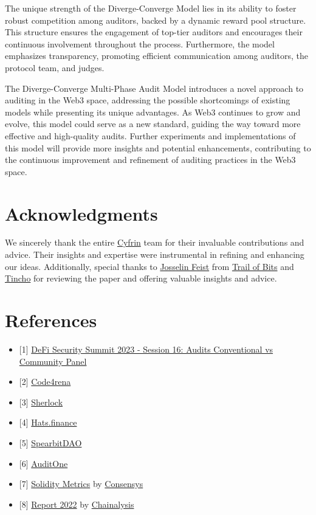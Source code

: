 \documentclass[10pt]{extarticle}
\def\tightlist{}
\begin{document}
The unique strength of the Diverge-Converge Model lies in its ability to
foster robust competition among auditors, backed by a dynamic reward
pool structure. This structure ensures the engagement of top-tier
auditors and encourages their continuous involvement throughout the
process. Furthermore, the model emphasizes transparency, promoting
efficient communication among auditors, the protocol team, and judges.

The Diverge-Converge Multi-Phase Audit Model introduces a novel approach
to auditing in the Web3 space, addressing the possible shortcomings of
existing models while presenting its unique advantages. As Web3
continues to grow and evolve, this model could serve as a new standard,
guiding the way toward more effective and high-quality audits. Further
experiments and implementations of this model will provide more insights
and potential enhancements, contributing to the continuous improvement
and refinement of auditing practices in the Web3 space.

\section{ Acknowledgments}\label{6-acknowledgments}

We sincerely thank the entire \href{https://www.cyfrin.io/}{Cyfrin} team
for their invaluable contributions and advice. Their insights and
expertise were instrumental in refining and enhancing our ideas.
Additionally, special thanks to
\href{https://twitter.com/Montyly}{Josselin Feist} from
\href{https://www.trailofbits.com/}{Trail of Bits} and
\href{https://twitter.com/tinchoabbate}{Tincho} for reviewing the paper
and offering valuable insights and advice.

\section{ References}\label{7-references}

\begin{itemize}
\tightlist
\item
  {[}1{]}
  \href{https://www.youtube.com/watch?v=_Yul_fHUjr8&list=PL5r4vTR0gHj5JL62S9R0umY64ue6mfQhd&index=43}{DeFi
  Security Summit 2023 - Session 16: Audits Conventional vs Community
  Panel}
\item
  {[}2{]} \href{https://code4rena.com/}{Code4rena}
\item
  {[}3{]} \href{https://sherlock.xyz/}{Sherlock}
\item
  {[}4{]} \href{https://app.hats.finance/}{Hats.finance}
\item
  {[}5{]} \href{https://spearbit.com/}{SpearbitDAO}
\item
  {[}6{]} \href{https://auditone.io/}{AuditOne}
\item
  {[}7{]}
  \href{https://marketplace.visualstudio.com/items?itemName=tintinweb.solidity-metrics}{Solidity
  Metrics} by \href{https://www.consensys.net/}{Consensys}
\item
  {[}8{]}
  \href{https://www.chainalysis.com/blog/2022-biggest-year-ever-for-crypto-hacking/}{Report
  2022} by \href{https://www.chainalysis.com/}{Chainalysis}
\end{itemize}
\end{document}
